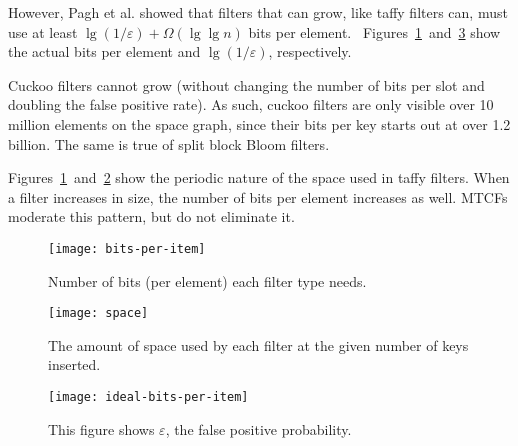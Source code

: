 \documentclass[sigconf]{acmart}
\newcommand{\etal}{et al.}
\begin{document}
However, Pagh \etal{} showed that filters that can grow, like taffy filters can, must use at least $\lg (1/\varepsilon) + \Omega(\lg \lg n)$ bits per element.~\cite{psw}
Figures~\ref{bits-per-item}~and~\ref{ideal-bits-per-item} show the actual bits per element and $\lg (1/\varepsilon)$, respectively.

Cuckoo filters cannot grow (without changing the number of bits per slot and doubling the false positive rate).
As such, cuckoo filters are only visible over 10 million elements on the space graph, since their bits per key starts out at over 1.2 billion.
The same is true of split block Bloom filters.

Figures~\ref{bits-per-item}~and~\ref{space-steps} show the periodic nature of the space used in taffy filters.
When a filter increases in size, the number of bits per element increases as well.
MTCFs moderate this pattern, but do not eliminate it.








\begin{figure}

  \texttt{[image: bits-per-item]}
  \caption{  \label{bits-per-item}
Number of bits (per element) each filter type needs.}
\end{figure}

\begin{figure}
  \texttt{[image: space]}
  \caption{
    \label{space-steps}
    The amount of space used by each filter at the given number of keys inserted.
  }
\end{figure}

\begin{figure}
  \texttt{[image: ideal-bits-per-item]}
  \caption{  \label{ideal-bits-per-item}
    This figure shows $\varepsilon$, the false positive probability.
  }
\end{figure}


\end{document}
